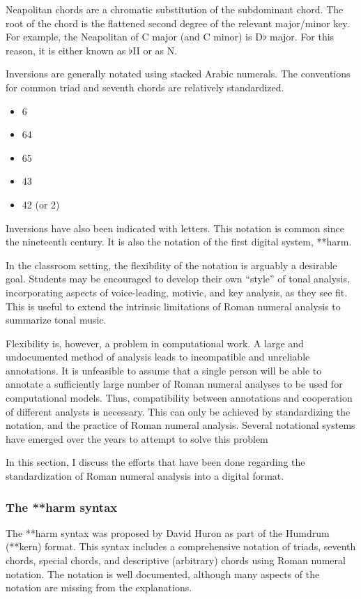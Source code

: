 Neapolitan chords are a chromatic substitution of the
subdominant chord. The root of the chord is the flattened
second degree of the relevant major/minor key. For example,
the Neapolitan of C major (and C minor) is D$\flat$ major.
For this reason, it is either known as $\flat$II or as N.

Inversions are generally notated using stacked Arabic
numerals. The conventions for common triad and seventh
chords are relatively standardized.

\begin{itemize}
    \item 6
    \item 64
    \item 65
    \item 43
    \item 42 (or 2)
\end{itemize}

Inversions have also been indicated with letters. This
notation is common since the nineteenth century. It is also
the notation of the first digital system, **harm.

In the classroom setting, the flexibility of the notation is
arguably a desirable goal. Students may be encouraged to
develop their own ``style'' of tonal analysis, incorporating
aspects of voice-leading, motivic, and key analysis, as they
see fit. This is useful to extend the intrinsic limitations
of Roman numeral analysis to summarize tonal music.

Flexibility is, however, a problem in computational work. A
large and undocumented method of analysis leads to
incompatible and unreliable annotations. It is unfeasible to
assume that a single person will be able to annotate a
sufficiently large number of Roman numeral analyses to be
used for computational models. Thus, compatibility between
annotations and cooperation of different analysts is
necessary. This can only be achieved by standardizing the
notation, and the practice of Roman numeral analysis.
Several notational systems have emerged over the years to
attempt to solve this problem

In this section, I discuss the efforts that have been done
regarding the standardization of Roman numeral analysis into
a digital format.

\subsubsection{The **harm syntax}
The **harm syntax was proposed by David Huron as part of the
Humdrum (**kern) format. This syntax includes a
comprehensive notation of triads, seventh chords, special
chords, and descriptive (arbitrary) chords using Roman
numeral notation. The notation is well documented, although
many aspects of the notation are missing from the
explanations.


